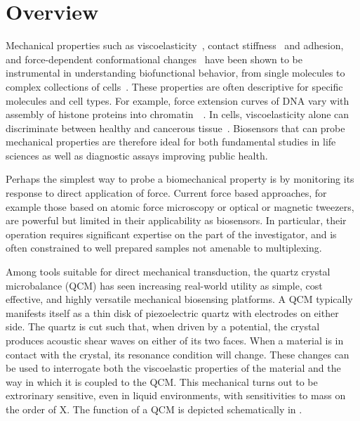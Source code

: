 \section{Overview}
Mechanical properties such as
viscoelasticity~\cite{steinem2007piezoelectric}, contact
stiffness~\cite{johannsman2007contacts} and adhesion, and force-dependent
conformational changes~\cite{fant2000adsorption} have been shown to be
instrumental in understanding biofunctional behavior, from single molecules
to complex collections of cells~\cite{li2008thickness}. These properties
are often descriptive for specific molecules and cell types. For example,
force extension curves of DNA vary with assembly of histone proteins into
chromatin~\cite{cui2000pulling}~\cite{larson2012trigger}. In cells,
viscoelasticity alone can discriminate between healthy and cancerous
tissue~\cite{rebelo2013comparison}.  Biosensors that can probe mechanical
properties are therefore ideal for both fundamental studies in life
sciences as well as diagnostic assays improving public health.

Perhaps the simplest way to probe a biomechanical property is by monitoring
its response to direct application of force. Current force based
approaches, for example those based on atomic force microscopy or optical
or magnetic tweezers, are powerful but limited in their applicability as
biosensors. In particular, their operation requires significant expertise
on the part of the investigator, and is often constrained to well prepared
samples not amenable to multiplexing.

Among tools suitable for direct mechanical transduction, the quartz crystal
microbalance (QCM) has seen increasing real-world utility as simple, cost
effective, and highly versatile mechanical biosensing platforms.  A QCM
typically manifests itself as a thin disk of piezoelectric quartz with
electrodes on either side.  The quartz is cut such that, when driven by a
potential, the crystal produces acoustic shear waves on either of its two
faces.  When a material is in contact with the crystal, its resonance
condition will change.  These changes can be used to interrogate both the
viscoelastic properties of the material and the way in which it is coupled
to the QCM.  This mechanical turns out to be extrorinary sensitive, even in
liquid environments, with sensitivities to mass on the order of X.  The
function of a QCM is depicted schematically in .


